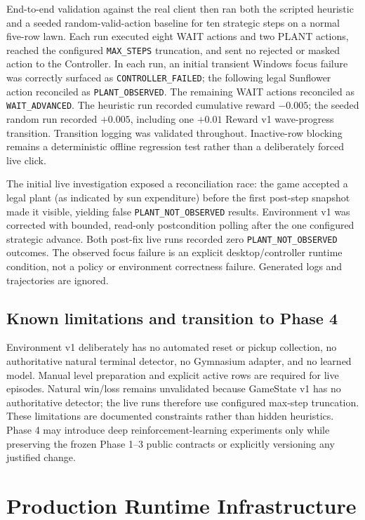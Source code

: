 \documentclass[11pt,a4paper]{article}
\begin{document}
End-to-end validation against the real client then ran both the scripted heuristic and a seeded random-valid-action baseline for ten strategic steps on a normal five-row lawn. Each run executed eight WAIT actions and two PLANT actions, reached the configured \texttt{MAX\_STEPS} truncation, and sent no rejected or masked action to the Controller. In each run, an initial transient Windows focus failure was correctly surfaced as \texttt{CONTROLLER\_FAILED}; the following legal Sunflower action reconciled as \texttt{PLANT\_OBSERVED}. The remaining WAIT actions reconciled as \texttt{WAIT\_ADVANCED}. The heuristic run recorded cumulative reward $-0.005$; the seeded random run recorded $+0.005$, including one $+0.01$ Reward v1 wave-progress transition. Transition logging was validated throughout. Inactive-row blocking remains a deterministic offline regression test rather than a deliberately forced live click.

The initial live investigation exposed a reconciliation race: the game accepted a legal plant (as indicated by sun expenditure) before the first post-step snapshot made it visible, yielding false \texttt{PLANT\_NOT\_OBSERVED} results. Environment v1 was corrected with bounded, read-only postcondition polling after the one configured strategic advance. Both post-fix live runs recorded zero \texttt{PLANT\_NOT\_OBSERVED} outcomes. The observed focus failure is an explicit desktop/controller runtime condition, not a policy or environment correctness failure. Generated logs and trajectories are ignored.

\subsection{Known limitations and transition to Phase 4}
Environment v1 deliberately has no automated reset or pickup collection, no authoritative natural terminal detector, no Gymnasium adapter, and no learned model. Manual level preparation and explicit active rows are required for live episodes. Natural win/loss remains unvalidated because GameState v1 has no authoritative detector; the live runs therefore use configured max-step truncation. These limitations are documented constraints rather than hidden heuristics. Phase 4 may introduce deep reinforcement-learning experiments only while preserving the frozen Phase 1--3 public contracts or explicitly versioning any justified change.

\section{Production Runtime Infrastructure}
\end{document}
